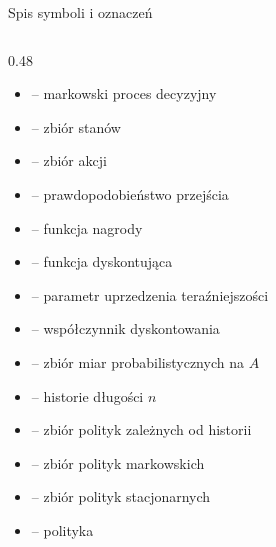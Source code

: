 \documentclass[aspectratio=169]{beamer}
\begin{document}
\begin{frame}{Spis symboli i oznaczeń}
    \scriptsize %
    \begin{columns}[T] %
        \begin{column}{0.48\textwidth}
            \begin{itemize}
                \setlength{\itemsep}{1pt} %
                \item[$M$] -- markowski proces decyzyjny
                \item[$S$] -- zbiór stanów
                \item[$A$] -- zbiór akcji
                \item[$q$] -- prawdopodobieństwo przejścia
                \item[$r$] -- funkcja nagrody
                \item[$d(t)$] -- funkcja dyskontująca
                \item[$\alpha$] -- parametr uprzedzenia teraźniejszości
                \item[$\beta$] -- współczynnik dyskontowania
                \item[$\Pr(A)$] -- zbiór miar probabilistycznych na $A$
                \item[$\mathcal{H}_n$] -- historie długości $n$
                \item[$\Phi$] -- zbiór polityk zależnych od historii
                \item[$\Phi_m$] -- zbiór polityk markowskich
                \item[$\Phi_s$] -- zbiór polityk stacjonarnych
                \item[$\phi$] -- polityka
            \end{itemize}
        \end{column}


\end{columns}
\end{frame}
\end{document}
